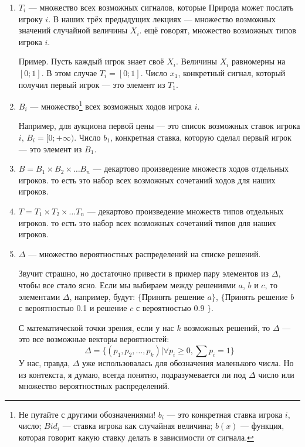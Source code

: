 \begin{enumerate}
\item $ T_{i} $ — множество всех возможных сигналов, которые Природа может послать игроку $ i $. В наших трёх предыдущих лекциях — множество возможных значений случайной величины $ X_{i} $. ещё говорят, множество возможных типов игрока $ i $.

Пример. Пусть каждый игрок знает своё $ X_{i} $. Величины $ X_{i}  $ равномерны на $ [0;1] $. В этом случае $ T_{i}=[0;1] $. Число $ x_{1} $, конкретный сигнал, который получил первый игрок — это элемент из $ T_{1} $.
\item $ B_{i} $ — множество\footnote{Не путайте с другими обозначениями! $ b_{i} $ — это конкретная ставка игрока $ i $, число; $ Bid_{i} $ — ставка игрока как случайная величина; $ b(x) $ — функция, которая говорит какую ставку делать в зависимости от сигнала.}  всех возможных ходов игрока $ i $.

Например, для аукциона первой цены — это список возможных ставок игрока $ i $, $ B_{i}=[0;+\infty) $. Число $ b_{1} $, конкретная ставка, которую сделал первый игрок — это элемент из $ B_{1} $.

\item $ B=B_{1}\times B_{2}\times \ldots B_{n} $ — декартово произведение множеств ходов отдельных игроков. то есть это набор всех возможных сочетаний ходов для наших игроков.

\item $ T=T_{1}\times T_{2}\times \ldots T_{n} $ — декартово произведение множеств типов отдельных игроков. то есть это набор всех возможных сочетаний типов для наших игроков.

\item $ \Delta $ — множество вероятностных распределений на списке решений.

Звучит страшно, но достаточно привести в пример пару элементов из $ \Delta $, чтобы все стало ясно. Если мы выбираем между решениями $ a $, $ b $ и $ c $, то элементами $ \Delta $, например, будут: $ \{ $Принять решение $ a\} $, $ \{ $Принять решение $ b $ с вероятностью 0.1 и решение $c$ с вероятностью 0.9 $ \}$.

С математической точки зрения, если у нас $ k $ возможных решений, то $ \Delta $ — это все возможные векторы вероятностей:
\begin{equation}
\Delta=\{(p_{1},p_{2},\ldots,p_{k})|\forall p_{i}\geq 0, \sum p_{i}=1 \}
\end{equation}
У нас, правда, $ \Delta $ уже использовалась для обозначения маленького числа. Но из контекста, я думаю, всегда понятно, подразумевается ли под $ \Delta $ число или множество вероятностных распределений.

\end{enumerate}

